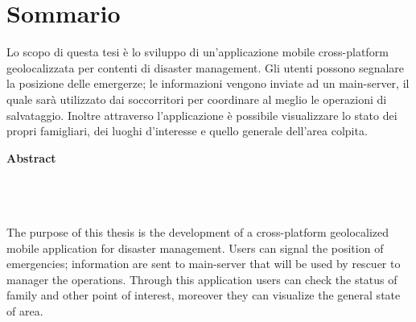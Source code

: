 \chapter*{Sommario}
\thispagestyle{empty}

Lo scopo di questa tesi è lo sviluppo di un'applicazione mobile cross-platform geolocalizzata per contenti di disaster management. Gli utenti possono segnalare la posizione delle emergerze; le informazioni vengono inviate ad un main-server, il quale sarà utilizzato dai soccorritori per coordinare al meglio le operazioni di salvataggio. Inoltre attraverso l'applicazione è possibile visualizzare lo stato dei propri famigliari, dei luoghi d'interesse e quello generale dell'area colpita.
\\
\noindent
\begin{Huge}
\textbf{Abstract}
\end{Huge}
\\
\\
\\
\noindent
The purpose of this thesis is the development of a cross-platform geolocalized mobile application for disaster management. Users can signal the position of emergencies; information are sent to main-server that will be used by rescuer to manager the operations. Through this application users can check the status of family and other point of interest, moreover they can visualize the general state of area.
